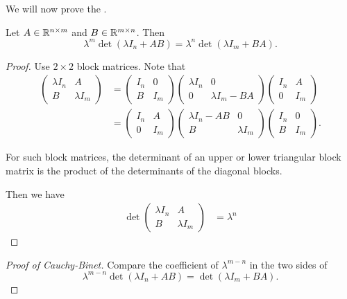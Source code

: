 We will now prove the .
\begin{lemma*} \label{thm:sylvester}
    Let $A \in \mathbb{R}^{n \times m}$ and $B \in \mathbb{R}^{m \times n}$.
    Then \[
        \lambda^m \det(\lambda I_n + AB) = \lambda^n \det(\lambda I_m + BA).
    \]
\end{lemma*}
\begin{proof}
    Use $2\times 2$ block matrices.
    Note that \begin{align*}
        \begin{pmatrix}
            \lambda I_n & A \\
            B & \lambda I_m
        \end{pmatrix}
        &= \begin{pmatrix}
            I_n & 0 \\
            B & I_m
        \end{pmatrix} \begin{pmatrix}
            \lambda I_n & 0 \\
            0 & \lambda I_m - BA
        \end{pmatrix} \begin{pmatrix}
            I_n & A \\
            0 & I_m
        \end{pmatrix} \\
        &= \begin{pmatrix}
            I_n & A \\
            0 & I_m
        \end{pmatrix} \begin{pmatrix}
            \lambda I_n - AB & 0 \\
            B & \lambda I_m
        \end{pmatrix} \begin{pmatrix}
            I_n & 0 \\
            B & I_m
        \end{pmatrix}.
    \end{align*}
    \begin{fact}
        For such block matrices, the determinant of an upper or lower
        triangular block matrix is the product of the determinants of the
        diagonal blocks.
    \end{fact}
    Then we have \begin{align*}
        \det\begin{pmatrix}
            \lambda I_n & A \\
            B & \lambda I_m
        \end{pmatrix}
        &= \lambda^n 
    \end{align*}
\end{proof}
\begin{proof}[Proof of Cauchy-Binet]
    Compare the coefficient of $\lambda^{m-n}$ in the two sides of \[
        \lambda^{m-n} \det(\lambda I_n + AB) = \det(\lambda I_m + BA).
    \]
\end{proof}

